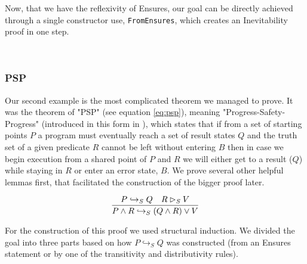 Now, that we have the reflexivity of Ensures, our goal can be directly achieved through a single constructor use, \verb|FromEnsures|, which creates an Inevitability proof in one step.

\begin{code}
    \>[2]\AgdaSpace{}%
    \AgdaSymbol{:}\AgdaSpace{}%
    \AgdaSpace{}%
    \AgdaSpace{}%
    \AgdaSpace{}%
    \AgdaSpace{}%
    \AgdaOperator{\AgdaFunction{↪[}}\AgdaSpace{}%
    \AgdaSpace{}%
    \AgdaOperator{\AgdaFunction{]}}\AgdaSpace{}%
    \<%
    \\
    \>[2]\AgdaSpace{}%
    \AgdaSpace{}%
    \AgdaSymbol{=}\AgdaSpace{}%
    \AgdaSpace{}%
    \AgdaSymbol{(}\AgdaSpace{}%
    \AgdaSymbol{)}\<%
\end{code}
    
\subsubsection{PSP}

Our second example is the most complicated theorem we managed to prove. It was the theorem of "PSP" (see equation \ref{eq:psp}), meaning "Progress-Safety-Progress" (introduced in this form in \cite{Chandy1988ParallelPD}), which states that if from a set of starting points $P$ a program must eventually reach a set of result states $Q$ and the truth set of a given predicate $R$ cannot be left without entering $B$ then in case we begin execution from a shared point of $P$ and $R$ we will either get to a result ($Q$) while staying in $R$ or enter an error state, $B$. We prove several other helpful lemmas first, that facilitated the construction of the bigger proof later.

\begin{equation}
    \label{eq:psp}
    \infer{P \land R \hookrightarrow_S (Q \land R) \lor V}{P \hookrightarrow_S Q & R \rhd_S V}
\end{equation}


For the construction of this proof we used structural induction. We divided the goal into three parts based on how $P \hookrightarrow_S Q$ was constructed (from an Ensures statement or by one of the transitivity and distributivity rules).

